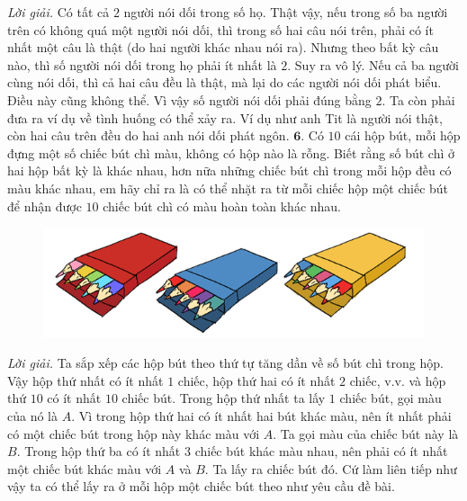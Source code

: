 \begin{multicols}{2}
\begin{figure}[H]
		\vspace*{-15pt}
	\end{figure}
	\textit{Lời giải.} Có tất cả $2$ người nói dối trong số họ. Thật vậy, nếu trong số ba người trên có không quá một người nói dối, thì trong số hai câu nói trên, phải có ít nhất một câu là thật (do hai người khác nhau nói ra). Nhưng theo bất kỳ câu nào, thì số người nói dối trong họ phải ít nhất là $2$. Suy ra vô lý.
	\vskip 0.1cm
	Nếu cả ba người cùng nói dối, thì cả hai câu đều là thật, mà lại do các người nói dối phát biểu. Điều này cũng không thể.
	\vskip 0.1cm
	Vì vậy số người nói dối phải đúng bằng $2$.
	\vskip 0.1cm
	Ta còn phải đưa ra ví dụ về tình huống có thể xảy ra. Ví dụ như anh Tit là người nói thật, còn hai câu trên đều do hai anh nói dối phát ngôn.
	\vskip 0.1cm
	$\pmb{6.}$ Có $10$ cái hộp bút, mỗi hộp đựng một số chiếc bút chì màu, không có hộp nào là rỗng. Biết rằng số bút chì ở hai hộp bất kỳ là khác nhau, hơn nữa những chiếc bút chì trong mỗi hộp đều có màu khác nhau, em hãy chỉ ra là có thể nhặt ra từ mỗi chiếc hộp một chiếc bút để nhận được $10$ chiếc bút chì có màu hoàn toàn khác nhau. 
	\begin{figure}[H]
		\vspace*{-5pt}
		\centering
		\captionsetup{labelformat= empty, justification=centering}
		\includegraphics[width= 1\linewidth]{b6}
		\vspace*{-15pt}
	\end{figure}
	\textit{Lời giải.} Ta sắp xếp các hộp bút theo thứ tự tăng dần về số bút chì trong hộp. Vậy hộp thứ nhất có ít nhất $1$ chiếc, hộp thứ hai có ít nhất $2$ chiếc, v.v. và hộp thứ $10$ có ít  nhất $10$ chiếc bút.
	\vskip 0.1cm
	Trong hộp thứ nhất ta lấy $1$ chiếc bút, gọi màu của nó là $A$. Vì trong hộp thứ hai có ít nhất hai bút khác màu, nên ít nhất phải có một chiếc bút trong hộp này khác màu với $A$. Ta gọi  màu của chiếc bút này là  $B$. Trong hộp thứ ba có ít nhất $3$ chiếc bút khác màu nhau, nên phải có ít nhất một chiếc bút khác màu với $A$ và $B$. Ta lấy ra chiếc bút đó. Cứ làm liên tiếp như vậy ta có thể lấy ra ở mỗi hộp một chiếc bút theo như yêu cầu đề bài.
\end{multicols}
